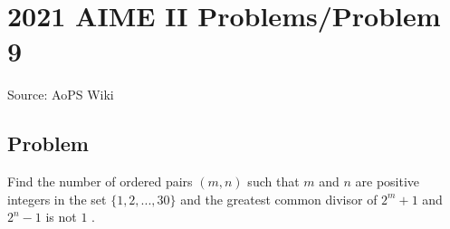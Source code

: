 \documentclass[12pt]{article}
\begin{document}
\section*{{2021 AIME II Problems/Problem 9}}
Source: AoPS Wiki

\subsection*{Problem}
Find the number of ordered pairs $(m, n)$ such that $m$ and $n$ are positive integers in the set $\{1, 2, ..., 30\}$ and the greatest common divisor of $2^m + 1$ and $2^n - 1$ is not $1$ .
\end{document}
